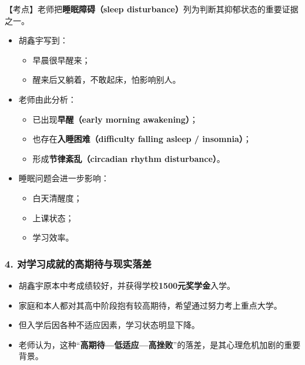 \documentclass[
  chinese,
  9pt,
  a4paper,
]{ctexart}
\providecommand{\tightlist}{%
  \setlength{\itemsep}{0pt}\setlength{\parskip}{0pt}}
\begin{document}
【考点】老师把\textbf{睡眠障碍（sleep
disturbance）}列为判断其抑郁状态的重要证据之一。

\begin{itemize}
\item
  胡鑫宇写到：

  \begin{itemize}
  \tightlist
  \item
    早晨很早醒来；
  \item
    醒来后又躺着，不敢起床，怕影响别人。
  \end{itemize}
\item
  老师由此分析：

  \begin{itemize}
  \tightlist
  \item
    已出现\textbf{早醒（early morning awakening）}；
  \item
    也存在\textbf{入睡困难（difficulty falling asleep / insomnia）}；
  \item
    形成\textbf{节律紊乱（circadian rhythm disturbance）}。
  \end{itemize}
\item
  睡眠问题会进一步影响：

  \begin{itemize}
  \tightlist
  \item
    白天清醒度；
  \item
    上课状态；
  \item
    学习效率。
  \end{itemize}
\end{itemize}

\subsubsection{4.
对学习成就的高期待与现实落差}\label{ux5bf9ux5b66ux4e60ux6210ux5c31ux7684ux9ad8ux671fux5f85ux4e0eux73b0ux5b9eux843dux5dee}

\begin{itemize}
\tightlist
\item
  胡鑫宇原本中考成绩较好，并获得学校\textbf{1500元奖学金}入学。
\item
  家庭和本人都对其高中阶段抱有较高期待，希望通过努力考上重点大学。
\item
  但入学后因各种不适应因素，学习状态明显下降。
\item
  老师认为，这种``\textbf{高期待---低适应---高挫败}''的落差，是其心理危机加剧的重要背景。
\end{itemize}
\end{document}
